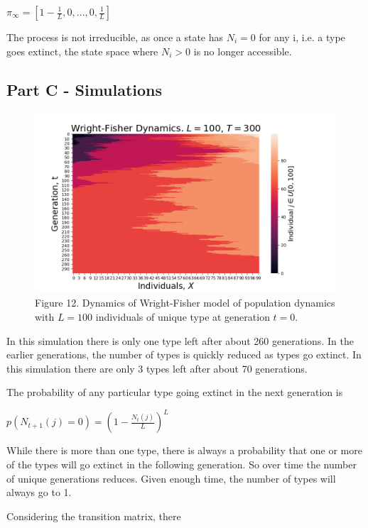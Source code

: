 \documentclass{article}
\begin{document}
$\pi_{\infty} = [1-\frac{1}{L},0,...,0,\frac{1}{L}]$



The process is not irreducible, as once a state has $N_i = 0$ for any i, i.e. a type goes extinct, the state space where $N_i >0$ is no longer accessible.

\subsection{Part C - Simulations}

\begin{figure}[H]
\includegraphics[scale=0.6]{Wright-Fisher_a.png} 
\small{Figure 12. Dynamics of Wright-Fisher model of population dynamics with $L=100$ individuals of unique type at generation $t=0$.}
\end{figure}

In this simulation there is only one type left after about 260 generations. In the earlier generations, the number of types is quickly reduced as types go extinct. In this simulation there are only 3 types left after about 70 generations. 

The probability of any particular type going extinct in the next generation is

$p(N_{t+1}(j) = 0) = (1-\frac{N_t(j)}{L})^{L}$





While there is more than one type, there is always a probability that one or more of the types will go extinct in the following generation. So over time the number of unique generations reduces. Given enough time, the number of types will always go to 1. 

Considering the transition matrix, there 
\end{document}
